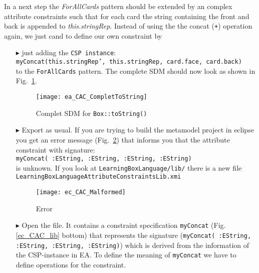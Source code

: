 In a next step the \emph{ForAllCards} pattern should be extended by an complex attribute constraints such that for each card the string containing the front and back is appended to \emph{this.stringRep}.  	 
Instead of using the the concat (\texttt{+}) operation again, we just cand to define our own constraint by
\begin{itemize}
\item[$\blacktriangleright$] just adding the \texttt{CSP instance}: \\
\hspace*{0.5cm}\texttt{\small myConcat(this.stringRep', this.stringRep, card.face, card.back)}\\
to the \texttt{ForAllCards} pattern. The complete SDM should now look as shown in Fig.~\ref{ea_CAC_CompletToString}.

\begin{figure}[htbp]
\begin{center}
  \texttt{[image: ea\_CAC\_CompletToString]}
  \caption{Complet SDM for \texttt{Box::toString()}}  
  \label{ea_CAC_CompletToString}
\end{center}
\end{figure}
\item[$\blacktriangleright$] Export as usual. If you are trying to build the metamodel project in eclipse you get an error message (Fig.~\ref{ec_CAC_Malformed}) that informs you that the attribute constraint with signature: \\
\hspace*{0.5cm} \texttt{\small myConcat( :EString, :EString, :EString, :EString)} \\
is unknown. If you look at \texttt{LearningBoxLanguage/lib/} there is a new file  \texttt{LearningBoxLanguageAttributeConstraintsLib.xmi} 
 
\begin{figure}[htbp]
\begin{center}
  \texttt{[image: ec\_CAC\_Malformed]}
  \caption{Error}  
  \label{ec_CAC_Malformed}
\end{center}
\end{figure}



\item[$\blacktriangleright$] Open the file. It contains a constraint specification \texttt{myConcat} (Fig.\ref{ec_CAC_lib} bottom) that represents the signature (\texttt{\small myConcat( :EString, :EString, :EString, :EString)}) which is derived from the information of the CSP-instance in EA. To define the meaning of \texttt{myConcat} we have to define operations for the constraint.


\end{itemize}

